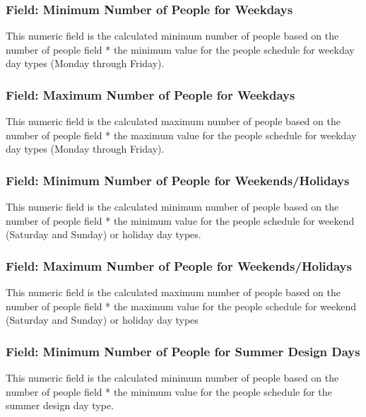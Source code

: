 \subsubsection{Field: Minimum Number of People for Weekdays}\label{field-minimum-number-of-people-for-weekdays}

This numeric field is the calculated minimum number of people based on the number of people field * the minimum value for the people schedule for weekday day types (Monday through Friday).

\subsubsection{Field: Maximum Number of People for Weekdays}\label{field-maximum-number-of-people-for-weekdays}

This numeric field is the calculated maximum number of people based on the number of people field * the maximum value for the people schedule for weekday day types (Monday through Friday).

\subsubsection{Field: Minimum Number of People for Weekends/Holidays}\label{field-minimum-number-of-people-for-weekends-holidays}

This numeric field is the calculated minimum number of people based on the number of people field * the minimum value for the people schedule for weekend (Saturday and Sunday) or holiday day types.

\subsubsection{Field: Maximum Number of People for Weekends/Holidays}\label{field-maximum-number-of-people-for-weekends-holidays}

This numeric field is the calculated maximum number of people based on the number of people field * the maximum value for the people schedule for weekend (Saturday and Sunday) or holiday day types

\subsubsection{Field: Minimum Number of People for Summer Design Days}\label{field-minimum-number-of-people-for-summer-designdays}

This numeric field is the calculated minimum number of people based on the number of people field * the minimum value for the people schedule for the summer design day type.


